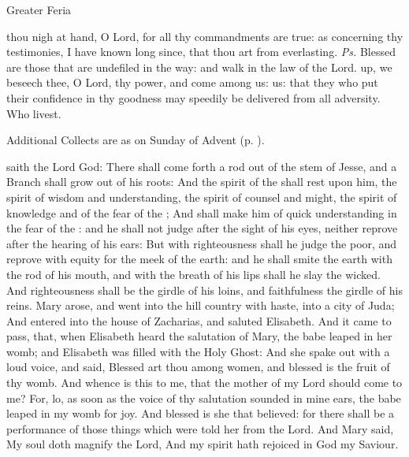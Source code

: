 \begin{inhead}
{Greater Feria}
\end{inhead}
\par\noindent
{}


\introit
{} thou nigh at hand, O Lord, for all thy commandments are true: as concerning thy testimonies, I have known long since, that thou art from everlasting. \textit{Ps.} Blessed are those that are undefiled in the way: and walk in the law of the Lord.
\collect
{} up, we beseech thee, O Lord, thy power, and come among us: us: that they who put their confidence in thy goodness may speedily be delivered from all adversity. Who livest.
\begin{rubric}
    Additional Collects are as on  Sunday of Advent (p. \pageref{AdventI}).
\end{rubric}
 saith the Lord God: There shall come forth a rod out of the stem of Jesse, and a Branch shall grow out of his roots: And the spirit of the  shall rest upon him, the spirit of wisdom and understanding, the spirit of counsel and might, the spirit of knowledge and of the fear of the ; And shall make him of quick understanding in the fear of the : and he shall not judge after the sight of his eyes, neither reprove after the hearing of his ears: But with righteousness shall he judge the poor, and reprove with equity for the meek of the earth: and he shall smite the earth with the rod of his mouth, and with the breath of his lips shall he slay the wicked. And righteousness shall be the girdle of his loins, and faithfulness the girdle of his reins.
 Mary arose, and went into the hill country with haste, into a city of Juda; And entered into the house of Zacharias, and saluted Elisabeth. And it came to pass, that, when Elisabeth heard the salutation of Mary, the babe leaped in her womb; and Elisabeth was filled with the Holy Ghost: And she spake out with a loud voice, and said, Blessed art thou among women, and blessed is the fruit of thy womb. And whence is this to me, that the mother of my Lord should come to me? For, lo, as soon as the voice of thy salutation sounded in mine ears, the babe leaped in my womb for joy. And blessed is she that believed: for there shall be a performance of those things which were told her from the Lord. And Mary said, My soul doth magnify the Lord, And my spirit hath rejoiced in God my Saviour.
